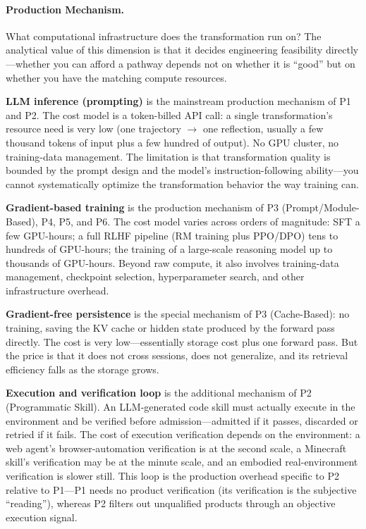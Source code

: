 \paragraph{Production Mechanism.} What computational infrastructure does the transformation run on? The analytical value of this dimension is that it decides engineering feasibility directly---whether you can afford a pathway depends not on whether it is ``good'' but on whether you have the matching compute resources.

\textbf{LLM inference (prompting)} is the mainstream production mechanism of P1 and P2. The cost model is a token-billed API call: a single transformation's resource need is very low (one trajectory $\rightarrow$ one reflection, usually a few thousand tokens of input plus a few hundred of output). No GPU cluster, no training-data management. The limitation is that transformation quality is bounded by the prompt design and the model's instruction-following ability---you cannot systematically optimize the transformation behavior the way training can.

\textbf{Gradient-based training} is the production mechanism of P3 (Prompt/Module-Based), P4, P5, and P6. The cost model varies across orders of magnitude: SFT a few GPU-hours; a full RLHF pipeline (RM training plus PPO/DPO) tens to hundreds of GPU-hours; the training of a large-scale reasoning model up to thousands of GPU-hours. Beyond raw compute, it also involves training-data management, checkpoint selection, hyperparameter search, and other infrastructure overhead.

\textbf{Gradient-free persistence} is the special mechanism of P3 (Cache-Based): no training, saving the KV cache or hidden state produced by the forward pass directly. The cost is very low---essentially storage cost plus one forward pass. But the price is that it does not cross sessions, does not generalize, and its retrieval efficiency falls as the storage grows.

\textbf{Execution and verification loop} is the additional mechanism of P2 (Programmatic Skill). An LLM-generated code skill must actually execute in the environment and be verified before admission---admitted if it passes, discarded or retried if it fails. The cost of execution verification depends on the environment: a web agent's browser-automation verification is at the second scale, a Minecraft skill's verification may be at the minute scale, and an embodied real-environment verification is slower still. This loop is the production overhead specific to P2 relative to P1---P1 needs no product verification (its verification is the subjective ``reading''), whereas P2 filters out unqualified products through an objective execution signal.

